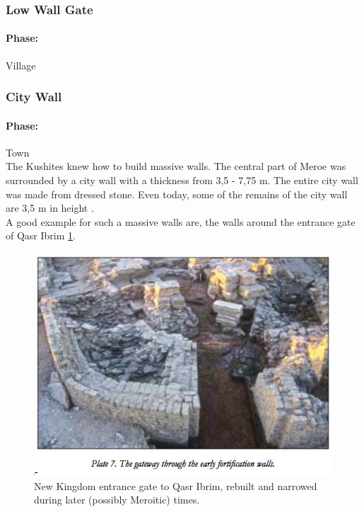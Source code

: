 \documentclass[a4paper,12pt]{scrreprt}
\begin{document}
\subsubsection{Low Wall Gate}

\paragraph{Phase:} Village\\

\subsubsection{City Wall}

\paragraph{Phase:} Town\\

The Kushites knew how to build massive walls. The central part of Meroe was surrounded by a city wall with a thickness from 3,5 - 7,75 m. The entire city wall was made from dressed stone. Even today, some of the remains of the city wall are 3,5 m in height \citep[p. 43]{welsby_kingdom_2005}.\\

A good example for such a massive walls are, the walls around the entrance gate of Qasr Ibrim \ref{fig:city_wall}.

\begin{figure}[H]
	\centering
	\includegraphics[width=\textwidth]{img/walls_gates/new_kingdom_entrance_gate}
	\caption{New Kingdom entrance gate to Qasr Ibrim, rebuilt and narrowed during later (possibly Meroitic) times.}\label{fig:city_wall}
\end{figure}
\end{document}
